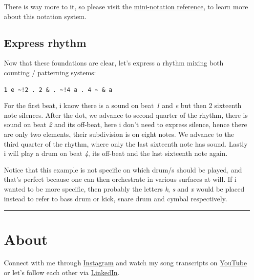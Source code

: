 \documentclass[
]{book}
\begin{document}
There is way more to it, so please visit the \href{https://tidalcycles.org/docs/reference/mini_notation}{mini-notation reference}, to learn more about this notation system.

\hypertarget{express-rhythm}{%
\section*{Express rhythm}\label{express-rhythm}}

Now that these foundations are clear, let's express a rhythm mixing both counting / patterning systems:

\texttt{1\ e\ \textasciitilde{}!2\ .\ 2\ \&\ .\ \textasciitilde{}!4\ a\ .\ 4\ \textasciitilde{}\ \&\ a}

For the first beat, i know there is a sound on beat \emph{1} and \emph{e} but then 2 sixteenth note silences. After the dot, we advance to second quarter of the rhythm, there is sound on beat \emph{2} and its off-beat, here i don't need to express silence, hence there are only two elements, their subdivision is on eight notes. We advance to the third quarter of the rhythm, where only the last sixteenth note has sound. Lastly i will play a drum on beat \emph{4}, its off-beat and the last sixteenth note again.

Notice that this example is not specific on which drum/s should be played, and that's perfect because one can then orchestrate in various surfaces at will. If i wanted to be more specific, then probably the letters \emph{k}, \emph{s} and \emph{x} would be placed instead to refer to bass drum or kick, snare drum and cymbal respectively.

\begin{center}\rule{0.5\linewidth}{0.5pt}\end{center}

\hypertarget{About}{%
\chapter{About}\label{About}}

Connect with me through \href{https://www.instagram.com/isaac.medina/}{Instagram} and watch my song transcripts on \href{https://www.youtube.com/@drumathics}{YouTube} or let's follow each other via \href{https://mx.linkedin.com/in/isaacmedina/es}{LinkedIn}.

  
\end{document}
